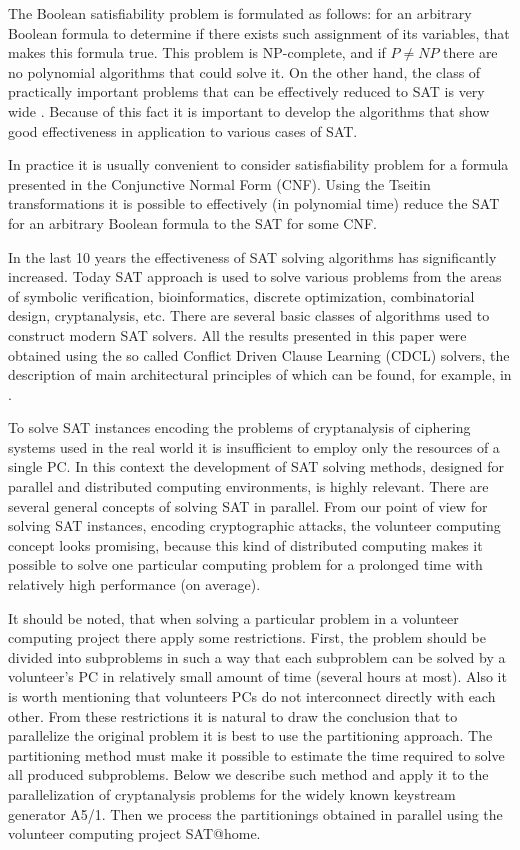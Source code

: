 \documentclass[runningheads,a4paper]{llncs}
\begin{document}
The Boolean satisfiability problem is formulated as follows: for an arbitrary Boolean formula to determine if there exists such assignment of its variables, that makes this formula true. This problem is NP-complete, and if $P\neq NP$ there are no polynomial algorithms that could solve it. On the other hand, the class of practically important problems that can be effectively reduced to SAT is very wide \cite{DBLP:series/faia/2009-185}. Because of this fact it is important to develop the algorithms that show good effectiveness in application to various cases of SAT.

In practice it is usually convenient to consider satisfiability problem for a formula presented in the Conjunctive Normal Form (CNF). Using the Tseitin transformations \cite{Tseitin83} it is possible to effectively (in polynomial time) reduce the SAT for an arbitrary Boolean formula to the SAT for some CNF.

In the last 10 years the effectiveness of SAT solving algorithms has significantly increased. Today SAT approach is used to solve various problems from the areas of symbolic verification, bioinformatics, discrete optimization, combinatorial design, cryptanalysis, etc. There are several basic classes of algorithms used to construct modern SAT solvers. All the results presented in this paper were obtained using the so called Conflict Driven Clause Learning (CDCL) solvers, the description of main architectural principles of which can be found, for example, in \cite{DBLP:series/faia/SilvaLM09}.

To solve SAT instances encoding the problems of cryptanalysis of ciphering systems used in the real world it is insufficient to employ only the resources of a single PC. In this context the development of SAT solving methods, designed for parallel and distributed computing environments, is highly relevant. There are several general concepts of solving SAT in parallel. From our point of view for solving SAT instances, encoding cryptographic attacks, the volunteer computing concept looks promising, because this kind of distributed computing makes it possible to solve one particular computing problem for a prolonged time with relatively high performance (on average).

It should be noted, that when solving a particular problem in a volunteer computing project there apply some restrictions. First, the problem should be divided into subproblems in such a way that each subproblem can be solved by a volunteer's PC in relatively small amount of time (several hours at most). Also it is worth mentioning that volunteers PCs do not interconnect directly with each other. From these restrictions it is natural to draw the conclusion that to parallelize the original problem it is best to use the partitioning approach. The partitioning method must make it possible to estimate the time required to solve all produced subproblems. Below we describe such method and apply it to the parallelization of cryptanalysis problems for the widely known keystream generator A5/1. Then we process the partitionings obtained in parallel using the volunteer computing project SAT@home.
\end{document}
